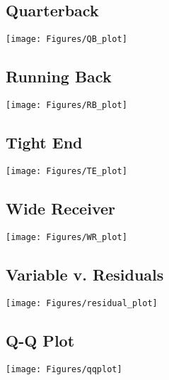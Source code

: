 \subsection{Quarterback}
\begin{flexfigure}[blanker]
	\centering
	\texttt{[image: Figures/QB\_plot]}
	\label{fig:qbplot}
\end{flexfigure}

\subsection{Running Back}
\begin{flexfigure}[blanker]
	\centering
	\texttt{[image: Figures/RB\_plot]}
	\label{fig:rbplot}
\end{flexfigure}


\subsection{Tight End}
\begin{flexfigure}[blanker]
	\centering
	\texttt{[image: Figures/TE\_plot]}
	\label{fig:teplot}
\end{flexfigure}

\subsection{Wide Receiver}
\begin{flexfigure}[blanker]
	\centering
	\texttt{[image: Figures/WR\_plot]}
	\label{fig:wrplot}
\end{flexfigure}

\subsection{Variable v. Residuals}
\begin{flexfigure}[blanker]
	\centering
	\texttt{[image: Figures/residual\_plot]}
	\label{fig:residualplot}
\end{flexfigure}

\subsection{Q-Q Plot}
\begin{flexfigure}[blanker]
	\centering
	\texttt{[image: Figures/qqplot]}
	\label{fig:qqplot}
\end{flexfigure}



